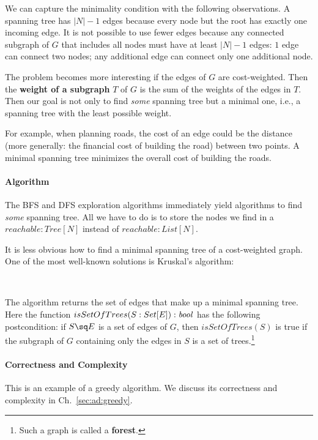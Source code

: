 We can capture the minimality condition with the following observations.
A spanning tree has $|N|-1$ edges because every node but the root has exactly one incoming edge.
It is not possible to use fewer edges because any connected subgraph of $G$ that includes all nodes must have at least $|N|-1$ edges: $1$ edge can connect two nodes; any additional edge can connect only one additional node.

The problem becomes more interesting if the edges of $G$ are cost-weighted.
Then the \textbf{weight of a subgraph} $T$ of $G$ is the sum of the weights of the edges in $T$.
Then our goal is not only to find \emph{some} spanning tree but a minimal one, i.e., a spanning tree with the least possible weight.

For example, when planning roads, the cost of an edge could be the distance (more generally: the financial cost of building the road) between two points.
A minimal spanning tree minimizes the overall cost of building the roads.

\paragraph{Algorithm}
The BFS and DFS exploration algorithms immediately yield algorithms to find \emph{some} spanning tree.
All we have to do is to store the nodes we find in a $reachable: Tree[N]$ instead of $reachable:List[N]$.

It is less obvious how to find a minimal spanning tree of a cost-weighted graph.
One of the most well-known solutions is Kruskal's algorithm:

\begin{acode}
\\
\end{acode}
The algorithm returns the set of edges that make up a minimal spanning tree.
Here the function $isSetOfTrees(S: Set[E]):\mathit{bool}$ has the following postcondition: if $S\sq E$ is a set of edges of $G$, then $isSetOfTrees(S)$ is true if the subgraph of $G$ containing only the edges in $S$ is a set of trees.\footnote{Such a graph is called a \textbf{forest}.}

\paragraph{Correctness and Complexity}
This is an example of a greedy algorithm.
We discuss its correctness and complexity in Ch.~\ref{sec:ad:greedy}.

